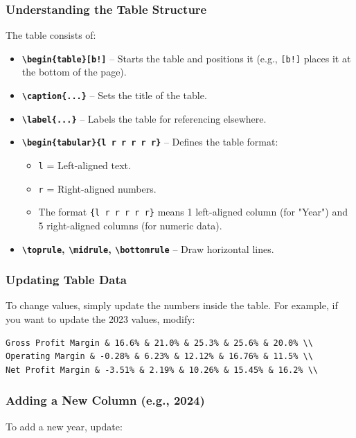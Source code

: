 \documentclass[a4paper,num-refs]{oup-contemporary}
\begin{document}
\subsubsection{Understanding the Table Structure}
The table consists of:
\begin{itemize}
    \item \textbf{\texttt{\textbackslash begin\{table\}[b!]}} – Starts the table and positions it (e.g., \texttt{[b!]} places it at the bottom of the page).
    \item \textbf{\texttt{\textbackslash caption\{...\}}} – Sets the title of the table.
    \item \textbf{\texttt{\textbackslash label\{...\}}} – Labels the table for referencing elsewhere.
    \item \textbf{\texttt{\textbackslash begin\{tabular\}\{l r r r r r\}}} – Defines the table format:
        \begin{itemize}
            \item \texttt{l} = Left-aligned text.
            \item \texttt{r} = Right-aligned numbers.
            \item The format \texttt{\{l r r r r r\}} means 1 left-aligned column (for "Year") and 5 right-aligned columns (for numeric data).
        \end{itemize}
    \item \textbf{\texttt{\textbackslash toprule}, \texttt{\textbackslash midrule}, \texttt{\textbackslash bottomrule}} – Draw horizontal lines.
\end{itemize}

\subsubsection{Updating Table Data}
To change values, simply update the numbers inside the table.  
For example, if you want to update the 2023 values, modify:

\begin{verbatim}
Gross Profit Margin & 16.6% & 21.0% & 25.3% & 25.6% & 20.0% \\  
Operating Margin & -0.28% & 6.23% & 12.12% & 16.76% & 11.5% \\  
Net Profit Margin & -3.51% & 2.19% & 10.26% & 15.45% & 16.2% \\  
\end{verbatim}

\subsubsection{Adding a New Column (e.g., 2024)}
To add a new year, update:\\
\end{document}
